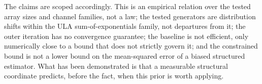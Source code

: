\documentclass[journal]{IEEEtran}
\begin{document}
The claims are scoped accordingly. This is an empirical relation over the
tested array sizes and channel families, not a law; the tested generators are
distribution shifts within the ULA sum-of-exponentials family, not departures
from it; the outer iteration has no convergence guarantee; the baseline is not
efficient, only numerically close to a bound that does not strictly govern it;
and the constrained bound is not a lower bound on the mean-squared error of a
biased structured estimator. What has been demonstrated is that a measurable
structural coordinate predicts, before the fact, when this prior is worth
applying.



\end{document}
